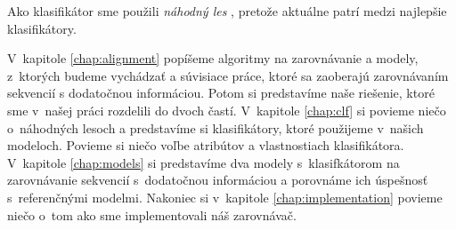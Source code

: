 

Ako klasifikátor sme použili \emph{náhodný les} \cite{randomForestPaper}, pretože aktuálne patrí medzi najlepšie klasifikátory.


V~kapitole \ref{chap:alignment} popíšeme algoritmy na zarovnávanie a modely, z~ktorých budeme vychádzať a súvisiace práce, ktoré sa zaoberajú zarovnávaním sekvencií s dodatočnou informáciou. Potom si predstavíme naše riešenie, ktoré sme v~našej práci rozdelili do dvoch častí. V~kapitole \ref{chap:clf} si povieme niečo o~náhodných lesoch a predstavíme si klasifikátory, ktoré použijeme v~našich modeloch. Povieme si niečo voľbe atribútov a vlastnostiach klasifikátora. V~kapitole \ref{chap:models} si predstavíme dva modely s~klasifkátorom na zarovnávanie sekvencií s~dodatočnou informáciou a porovnáme ich úspešnosť s~referenčnými modelmi. Nakoniec si v~kapitole \ref{chap:implementation} povieme niečo o~tom ako sme implementovali náš zarovnávač.

